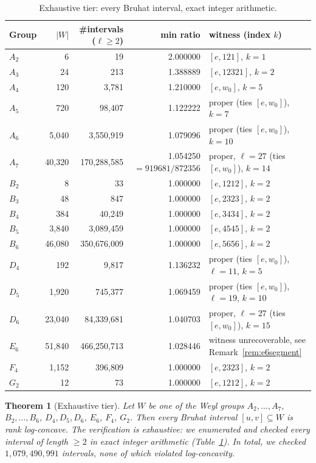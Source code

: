 \documentclass[11pt]{amsart}
\theoremstyle{plain}
\newtheorem{theorem}{Theorem}[section]
\theoremstyle{definition}
\theoremstyle{remark}
\newcommand{\W}{W}
\begin{document}
\begin{table}[htbp]
\centering
\caption{Exhaustive tier: every Bruhat interval, exact integer arithmetic.}
\label{tab:exhaustive}
\small
\begin{tabular}{@{}lrrrl@{}}
\toprule
Group & $|W|$ & \#intervals ($\ell\ge2$) & min ratio & witness (index $k$) \\
\midrule
$A_2$ & 6 & 19 & 2.000000 & $[e,121]$, $k=1$ \\
$A_3$ & 24 & 213 & 1.388889 & $[e,12321]$, $k=2$ \\
$A_4$ & 120 & 3{,}781 & 1.210000 & $[e,w_0]$, $k=5$ \\
$A_5$ & 720 & 98{,}407 & 1.122222 & proper (ties $[e,w_0]$), $k=7$ \\
$A_6$ & 5{,}040 & 3{,}550{,}919 & 1.079096 & proper (ties $[e,w_0]$), $k=10$ \\
$A_7$ & 40{,}320 & 170{,}288{,}585 & 1.054250 $=919681/872356$ & proper, $\ell=27$ (ties $[e,w_0]$), $k=14$ \\
$B_2$ & 8 & 33 & 1.000000 & $[e,1212]$, $k=2$ \\
$B_3$ & 48 & 847 & 1.000000 & $[e,2323]$, $k=2$ \\
$B_4$ & 384 & 40{,}249 & 1.000000 & $[e,3434]$, $k=2$ \\
$B_5$ & 3{,}840 & 3{,}089{,}459 & 1.000000 & $[e,4545]$, $k=2$ \\
$B_6$ & 46{,}080 & 350{,}676{,}009 & 1.000000 & $[e,5656]$, $k=2$ \\
$D_4$ & 192 & 9{,}817 & 1.136232 & proper (ties $[e,w_0]$), $\ell=11$, $k=5$ \\
$D_5$ & 1{,}920 & 745{,}377 & 1.069459 & proper (ties $[e,w_0]$), $\ell=19$, $k=10$ \\
$D_6$ & 23{,}040 & 84{,}339{,}681 & 1.040703 & proper, $\ell=27$ (ties $[e,w_0]$), $k=15$ \\
$E_6$ & 51{,}840 & 466{,}250{,}713 & 1.028446 & witness unrecoverable, see Remark~\ref{rem:e6segment} \\
$F_4$ & 1{,}152 & 396{,}809 & 1.000000 & $[e,2323]$, $k=2$ \\
$G_2$ & 12 & 73 & 1.000000 & $[e,1212]$, $k=2$ \\
\bottomrule
\end{tabular}
\end{table}

\begin{theorem}[Exhaustive tier]
\label{thm:V1}
Let $\W$ be one of the Weyl groups $A_2,\dots,A_7$, $B_2,\dots,B_6$,
$D_4,D_5,D_6$, $E_6$, $F_4$, $G_2$. Then every Bruhat interval
$[u,v]\subseteq \W$ is rank log-concave. The verification is exhaustive: we enumerated and checked every interval
of length $\ge 2$ in exact integer arithmetic
(Table~\ref{tab:exhaustive}). In total, we checked
$1{,}079{,}490{,}991$ intervals, none of which violated log-concavity.
\end{theorem}
\end{document}
